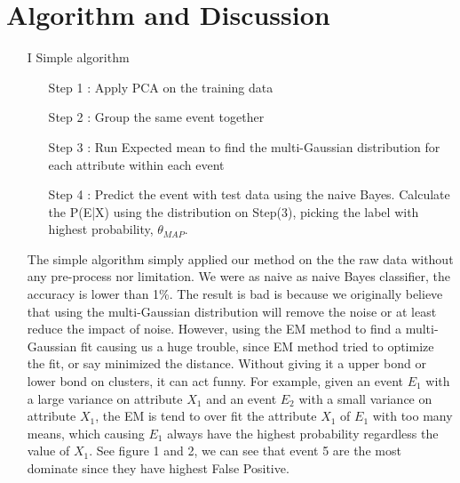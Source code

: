 \documentclass[a4paper, conference]{IEEEtran}
\begin{document}
\section{Algorithm and Discussion}
\begin{itemize}
\item [I] Simple algorithm
\begin{itemize}
\item [Step 1] : Apply PCA on the training data
\item [Step 2] : Group the same event together
\item [Step 3] : Run Expected mean to find the multi-Gaussian distribution for each attribute within each  event
\item [Step 4]: Predict the event with test data using the naive Bayes. Calculate the P(E|X) using the distribution on Step(3), picking the label with highest probability, $\theta_{MAP}$.
\end{itemize}
The simple algorithm simply applied our method on the the raw data without any pre-process nor limitation. We were as naive as naive Bayes classifier, the accuracy is lower than 1\%. The result is bad is because we originally believe that using the multi-Gaussian distribution will remove the noise or at least reduce the impact of noise. However, using the EM method to find a multi-Gaussian fit causing us a huge trouble, since EM method tried to optimize the fit, or say minimized the distance. 
Without giving it a upper bond or lower bond on clusters, it can act funny. For example, given an event $E_{1}$ with a large variance on attribute $X_{1}$ and an event $E_{2}$ with a small variance on attribute $X_{1}$, the EM is tend to over fit the attribute $X_{1}$ of $E_{1}$ with too many means, which causing $E_{1}$ always have the highest probability regardless the value of $X_{1}$.  See figure 1 and 2, we can see that event 5 are the most dominate since they have highest False Positive.\\


\end{itemize}
\end{document}
